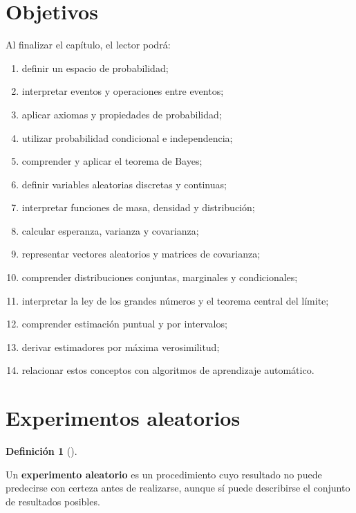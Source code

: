 \documentclass[
  spanish,
  10.5pt,
  letterpaper,
  DIV=11,
  numbers=noendperiod,
  oneside,
  open=any]{scrreprt}
\providecommand{\tightlist}{%
  \setlength{\itemsep}{0pt}\setlength{\parskip}{0pt}}
\theoremstyle{definition}
\newtheorem{definition}{Definición}[chapter]
\theoremstyle{definition}
\theoremstyle{plain}
\theoremstyle{remark}
\begin{document}
\section*{Objetivos}\label{objetivos-2}


Al finalizar el capítulo, el lector podrá:

\begin{enumerate}
\def\labelenumi{\arabic{enumi}.}
\tightlist
\item
  definir un espacio de probabilidad;
\item
  interpretar eventos y operaciones entre eventos;
\item
  aplicar axiomas y propiedades de probabilidad;
\item
  utilizar probabilidad condicional e independencia;
\item
  comprender y aplicar el teorema de Bayes;
\item
  definir variables aleatorias discretas y continuas;
\item
  interpretar funciones de masa, densidad y distribución;
\item
  calcular esperanza, varianza y covarianza;
\item
  representar vectores aleatorios y matrices de covarianza;
\item
  comprender distribuciones conjuntas, marginales y condicionales;
\item
  interpretar la ley de los grandes números y el teorema central del
  límite;
\item
  comprender estimación puntual y por intervalos;
\item
  derivar estimadores por máxima
  verosimilitud;
\item
  relacionar estos conceptos con algoritmos de aprendizaje automático.
\end{enumerate}

\section*{Experimentos aleatorios}\label{experimentos-aleatorios}


\begin{definition}[]\protect\hypertarget{def-experimento-aleatorio}{}\label{def-experimento-aleatorio}

Un \textbf{experimento aleatorio} es un procedimiento cuyo resultado no
puede predecirse con certeza antes de realizarse, aunque sí puede
describirse el conjunto de resultados posibles.

\end{definition}
\end{document}
